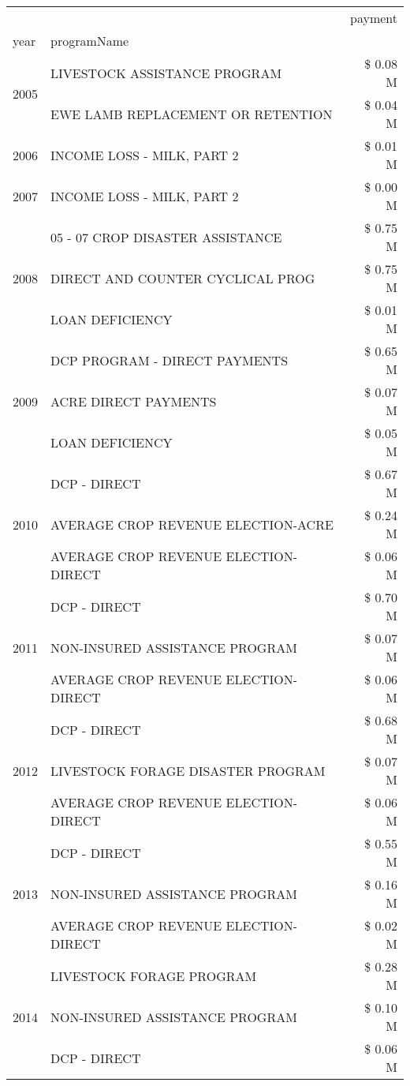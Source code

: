 \begin{tabular}{llr}
\toprule
 &  & payment \\
year & programName &  \\
\midrule
\multirow[t]{2}{*}{2005} & LIVESTOCK ASSISTANCE PROGRAM & \$ 0.08 M \\
 & EWE LAMB REPLACEMENT OR RETENTION & \$ 0.04 M \\
\cline{1-3}
2006 & INCOME LOSS - MILK, PART 2 & \$ 0.01 M \\
\cline{1-3}
2007 & INCOME LOSS - MILK, PART 2 & \$ 0.00 M \\
\cline{1-3}
\multirow[t]{3}{*}{2008} & 05 - 07 CROP DISASTER ASSISTANCE & \$ 0.75 M \\
 & DIRECT AND COUNTER CYCLICAL PROG & \$ 0.75 M \\
 & LOAN DEFICIENCY & \$ 0.01 M \\
\cline{1-3}
\multirow[t]{3}{*}{2009} & DCP PROGRAM - DIRECT PAYMENTS & \$ 0.65 M \\
 & ACRE DIRECT PAYMENTS & \$ 0.07 M \\
 & LOAN DEFICIENCY & \$ 0.05 M \\
\cline{1-3}
\multirow[t]{3}{*}{2010} & DCP - DIRECT & \$ 0.67 M \\
 & AVERAGE CROP REVENUE ELECTION-ACRE & \$ 0.24 M \\
 & AVERAGE CROP REVENUE ELECTION-DIRECT & \$ 0.06 M \\
\cline{1-3}
\multirow[t]{3}{*}{2011} & DCP - DIRECT & \$ 0.70 M \\
 & NON-INSURED ASSISTANCE PROGRAM & \$ 0.07 M \\
 & AVERAGE CROP REVENUE ELECTION-DIRECT & \$ 0.06 M \\
\cline{1-3}
\multirow[t]{3}{*}{2012} & DCP - DIRECT & \$ 0.68 M \\
 & LIVESTOCK FORAGE DISASTER PROGRAM & \$ 0.07 M \\
 & AVERAGE CROP REVENUE ELECTION-DIRECT & \$ 0.06 M \\
\cline{1-3}
\multirow[t]{3}{*}{2013} & DCP - DIRECT & \$ 0.55 M \\
 & NON-INSURED ASSISTANCE PROGRAM & \$ 0.16 M \\
 & AVERAGE CROP REVENUE ELECTION-DIRECT & \$ 0.02 M \\
\cline{1-3}
\multirow[t]{3}{*}{2014} & LIVESTOCK FORAGE PROGRAM & \$ 0.28 M \\
 & NON-INSURED ASSISTANCE PROGRAM & \$ 0.10 M \\
 & DCP - DIRECT & \$ 0.06 M \\

\end{tabular}
